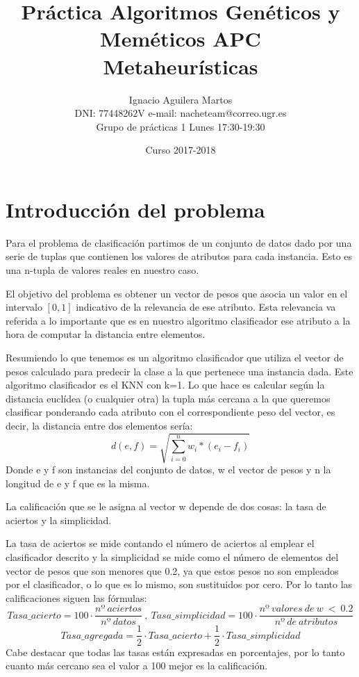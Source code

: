 \documentclass[12pt,a4paper]{article}
\author{Ignacio Aguilera Martos \\
	DNI: 77448262V       e-mail: nacheteam@correo.ugr.es \\
	Grupo de prácticas 1 Lunes 17:30-19:30}
\title{Práctica Algoritmos Genéticos y Meméticos APC \\ Metaheurísticas}
\date{Curso 2017-2018}
\begin{document}
	\maketitle

	\tableofcontents

	\newpage



	\section{Introducción del problema}
	\label{sec:introProblema}

	Para el problema de clasificación partimos de un conjunto de datos dado por una serie de tuplas que contienen los valores de atributos para cada instancia. Esto es una n-tupla de valores reales en nuestro caso.

	El objetivo del problema es obtener un vector de pesos que asocia un valor en el intervalo $[0,1]$ indicativo de la relevancia de ese atributo. Esta relevancia va referida a lo importante que es en nuestro algoritmo clasificador ese atributo a la hora de computar la distancia entre elementos.

	Resumiendo lo que tenemos es un algoritmo clasificador que utiliza el vector de pesos calculado para predecir la clase a la que pertenece una instancia dada. Este algoritmo clasificador es el KNN con k=1. Lo que hace es calcular según la distancia euclídea (o cualquier otra) la tupla más cercana a la que queremos clasificar ponderando cada atributo con el correspondiente peso del vector, es decir, la distancia entre dos elementos sería:
	$$d(e,f) = \sqrt{\sum_{i=0}^{n}w_i * (e_{i} - f_{i})}$$
	Donde e y f son instancias del conjunto de datos, w el vector de pesos y n la longitud de e y f que es la misma.

	La calificación que se le asigna al vector w depende de dos cosas: la tasa de aciertos y la simplicidad.

	La tasa de aciertos se mide contando el número de aciertos al emplear el clasificador descrito y la simplicidad se mide como el número de elementos del vector de pesos que son menores que 0.2, ya que estos pesos no son empleados por el clasificador, o lo que es lo mismo, son sustituidos por cero. Por lo tanto las calificaciones siguen las fórmulas:
	$$Tasa\_acierto = 100\cdot \frac{nº  \ aciertos}{nº \ datos} \ , \ Tasa\_simplicidad = 100\cdot \frac{nº \ valores \ de \ w \ < \ 0.2}{nº \ de \ atributos}$$
	$$Tasa\_agregada = \frac{1}{2}\cdot Tasa\_acierto + \frac{1}{2}\cdot Tasa\_simplicidad$$
	Cabe destacar que todas las tasas están expresadas en porcentajes, por lo tanto cuanto más cercano sea el valor a 100 mejor es la calificación.
\end{document}
